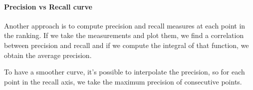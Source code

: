 \paragraph{Precision vs Recall curve}
Another approach is to compute precision and recall measures at each point in the ranking.
If we take the measurements and plot them, we find a correlation between precision 
and recall and if we compute the integral of that function, we obtain the average precision.

To have a smoother curve, it's possible to interpolate the precision, so for each 
point in the recall axis, we take the maximum precision of consecutive points.


